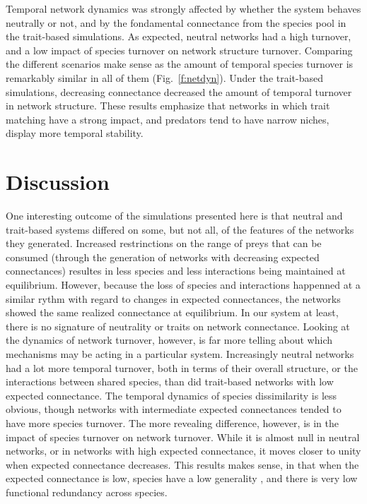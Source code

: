 \documentclass[10pt,twocolumn,fleqn]{article}
\begin{document}
Temporal network dynamics was strongly affected by whether the system behaves
neutrally or not, and by the fondamental connectance from the species pool in
the trait-based simulations. As expected, neutral networks had a high turnover,
and a low impact of species turnover on network structure turnover. Comparing
the different scenarios make sense as the amount of temporal species turnover is
remarkably similar in all of them (Fig.~\ref{f:netdyn}). Under the trait-based
simulations, decreasing connectance decreased the amount of temporal turnover in
network structure. These results emphasize that networks in which trait matching
have a strong impact, and predators tend to have narrow niches, display more
temporal stability.

\section{Discussion}

One interesting outcome of the simulations presented here is that neutral and
trait-based systems differed on some, but not all, of the features of the
networks they generated. Increased restrinctions on the range of preys that can
be consumed (through the generation of networks with decreasing expected
connectances) resultes in less species and less interactions being maintained at
equilibrium. However, because the loss of species and interactions happenned at
a similar rythm with regard to changes in expected connectances, the networks
showed the same realized connectance at equilibrium. In our system at least,
there is no signature of neutrality or traits on network connectance. Looking at
the dynamics of network turnover, however, is far more telling about which
mechanisms may be acting in a particular system. Increasingly neutral networks
had a lot more temporal turnover, both in terms of their overall structure, or
the interactions between shared species, than did trait-based networks with low
expected connectance. The temporal dynamics of species dissimilarity is less
obvious, though networks with intermediate expected connectances tended to have
more species turnover. The more revealing difference, however, is in the impact
of species turnover on network turnover. While it is almost null in neutral
networks, or in networks with high expected connectance, it moves closer to
unity when expected connectance decreases. This results makes sense, in that
when  the expected connectance is low, species have a low generality
\citep{schoener_food_1989}, and there is very low functional redundancy across
species.
\end{document}
